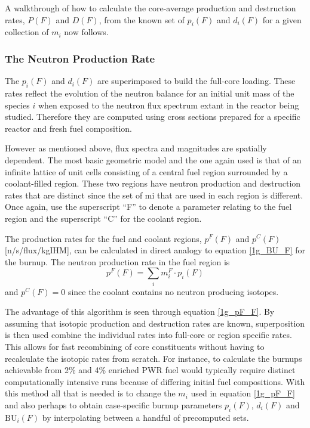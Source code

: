 A walkthrough of how to calculate the core-average production and destruction rates, $P(F)$ and $D(F)$, 
from the known set of $p_i(F)$ and $d_i(F)$ for a given collection of $m_i$ now follows.  




\subsubsection{The Neutron Production Rate}
\label{1g_sec:p_rate}
The $p_i(F)$ and $d_i(F)$ are superimposed to build the full-core loading.  These rates reflect the 
evolution of the neutron balance for an initial unit mass of the species $i$ when exposed to the 
neutron flux spectrum extant in the reactor being studied.  Therefore they are computed using cross 
sections prepared for a specific reactor and fresh fuel composition.

However as mentioned above, flux spectra and magnitudes are spatially dependent.  The most basic geometric 
model and the one again used is that of an infinite lattice of unit cells consisting of a central fuel region 
surrounded by a coolant-filled region.  These two regions have neutron production and destruction rates that 
are distinct since the set of mi that are used in each region is different.  Once again, use the 
superscript ``F'' to denote a parameter relating to the fuel region and the superscript ``C'' for the coolant 
region. 

The production rates for the fuel and coolant regions, $p^F(F)$ and $p^C(F)$ [n/s/flux/kgIHM], 
can be calculated in direct analogy to equation \ref{1g_BU_F} for the burnup.  The neutron production 
rate in the fuel region is 
\begin{equation}
\label{1g_pF_F}
p^F(F) = \sum_i m_i^F \cdot p_i(F)
\end{equation}
and $p^C(F) = 0$ since the coolant contains no neutron producing isotopes.  

The advantage of this algorithm is seen through equation \ref{1g_pF_F}.  By assuming that isotopic 
production and destruction rates are known, superposition is then used combine the individual rates 
into full-core or region specific rates.  This allows for fast recombining of core constituents without 
having to recalculate the isotopic rates from scratch.  For instance, to calculate the burnups achievable 
from 2\% and 4\%  enriched PWR fuel would typically require distinct computationally intensive 
runs because of differing initial fuel compositions.  With this method all that is needed is to change the 
$m_i$ used in equation \ref{1g_pF_F} and also perhaps to obtain case-specific burnup parameters $p_i(F)$, 
$d_i(F)$ and $\mbox{BU}_i(F)$ by interpolating between a handful of precomputed sets.  


